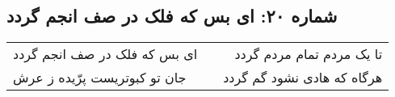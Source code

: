 \begin{center}
\section*{شماره ۲۰: ای بس که فلک در صف انجم گردد}
\label{sec:020}
\begin{longtable}{l p{0.5cm} r}
ای بس که فلک در صف انجم گردد
&&
تا یک مردم تمام مردم گردد
\\
جان تو کبوتریست پرّیده ز عرش
&&
هرگاه که هادی نشود گم گردد
\\
\end{longtable}
\end{center}
